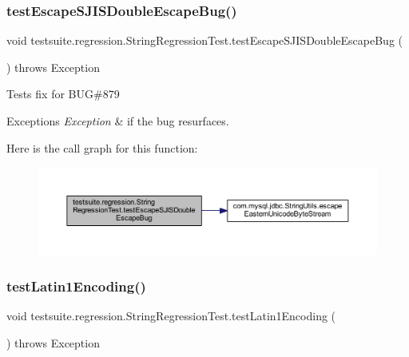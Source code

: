 \subsubsection{\texorpdfstring{test\+Escape\+S\+J\+I\+S\+Double\+Escape\+Bug()}{testEscapeSJISDoubleEscapeBug()}}
{\footnotesize\ttfamily void testsuite.\+regression.\+String\+Regression\+Test.\+test\+Escape\+S\+J\+I\+S\+Double\+Escape\+Bug (\begin{DoxyParamCaption}{ }\end{DoxyParamCaption}) throws Exception}

Tests fix for B\+UG\#879


\begin{DoxyExceptions}{Exceptions}
{\em Exception} & if the bug resurfaces. \\
\hline
\end{DoxyExceptions}
Here is the call graph for this function\+:
\nopagebreak
\begin{figure}[H]
\begin{center}
\leavevmode
\includegraphics[width=350pt]{classtestsuite_1_1regression_1_1_string_regression_test_aed5d3525cb076428271b0166d5537e83_cgraph}
\end{center}
\end{figure}
\mbox{\label{classtestsuite_1_1regression_1_1_string_regression_test_abcc37c5fb4c57b3f201afaadbc55ee13}} 
\subsubsection{\texorpdfstring{test\+Latin1\+Encoding()}{testLatin1Encoding()}}
{\footnotesize\ttfamily void testsuite.\+regression.\+String\+Regression\+Test.\+test\+Latin1\+Encoding (\begin{DoxyParamCaption}{ }\end{DoxyParamCaption}) throws Exception}

